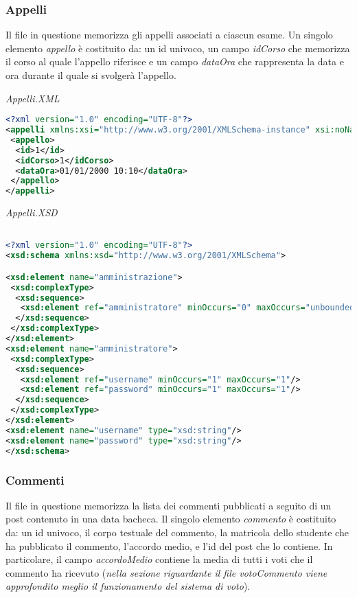 \documentclass [a4paper,11pt]{book}
\begin{document}
\medskip

\subsubsection{Appelli}

Il file in questione memorizza gli appelli associati a ciascun esame. Un singolo elemento \emph{appello} è costituito da: un id univoco, un campo \emph{idCorso} che memorizza il corso al quale l'appello riferisce e un campo \emph{dataOra} che rappresenta la data e ora durante il quale si svolgerà l'appello.

\medskip

\emph{Appelli.XML}

\begin{lstlisting}[language=XML]
<?xml version="1.0" encoding="UTF-8"?>
<appelli xmlns:xsi="http://www.w3.org/2001/XMLSchema-instance" xsi:noNamespaceSchemaLocation="appelli.xsd">
 <appello>
  <id>1</id>
  <idCorso>1</idCorso>
  <dataOra>01/01/2000 10:10</dataOra>
 </appello>
</appelli>
\end{lstlisting}

\medskip

\emph{Appelli.XSD}

\begin{lstlisting}[language=XML]

<?xml version="1.0" encoding="UTF-8"?>
<xsd:schema xmlns:xsd="http://www.w3.org/2001/XMLSchema">

<xsd:element name="amministrazione">
 <xsd:complexType>
  <xsd:sequence>
   <xsd:element ref="amministratore" minOccurs="0" maxOccurs="unbounded" />
  </xsd:sequence>
 </xsd:complexType>
</xsd:element>
<xsd:element name="amministratore">
 <xsd:complexType>
  <xsd:sequence>
   <xsd:element ref="username" minOccurs="1" maxOccurs="1"/>
   <xsd:element ref="password" minOccurs="1" maxOccurs="1"/>
  </xsd:sequence>
 </xsd:complexType>
</xsd:element>
<xsd:element name="username" type="xsd:string"/>
<xsd:element name="password" type="xsd:string"/>
</xsd:schema>
\end{lstlisting}

\medskip

\subsubsection{Commenti}

Il file in questione memorizza la lista dei commenti pubblicati a seguito di un post contenuto in una data bacheca. Il singolo elemento \emph{commento} è costituito da: un id univoco, il corpo testuale del commento, la matricola dello studente che ha pubblicato il commento, l'accordo medio, e l'id del post che lo contiene. In particolare, il campo \emph{accordoMedio} contiene la media di tutti i voti che il commento ha ricevuto (\emph{nella sezione riguardante il file votoCommento viene approfondito meglio il funzionamento del sistema di voto}).
\end{document}
